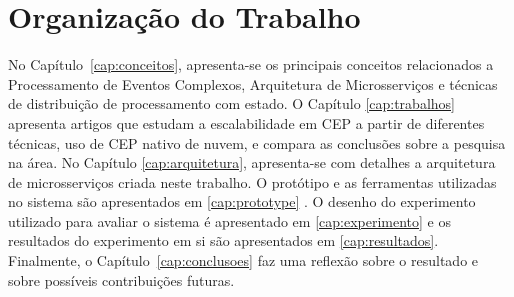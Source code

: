 






\section{Organização do Trabalho}
\label{sec:organizacao_trabalho}


No Capítulo~\ref{cap:conceitos}, apresenta-se os principais conceitos relacionados a Processamento de Eventos Complexos, Arquitetura de Microsserviços e técnicas de distribuição de processamento com estado. O Capítulo \ref{cap:trabalhos} apresenta artigos que estudam a escalabilidade em CEP a partir de diferentes técnicas, uso de CEP nativo de nuvem, e compara as conclusões sobre a pesquisa na área. No Capítulo \ref{cap:arquitetura}, apresenta-se com detalhes a arquitetura de microsserviços criada neste trabalho. O protótipo e as ferramentas utilizadas no sistema  são apresentados em \ref{cap:prototype} . O desenho do experimento utilizado para avaliar o sistema é apresentado em \ref{cap:experimento} e os resultados do experimento em si são apresentados em \ref{cap:resultados}. Finalmente, o Capítulo~\ref{cap:conclusoes} faz uma reflexão sobre o resultado e sobre possíveis contribuições futuras.

